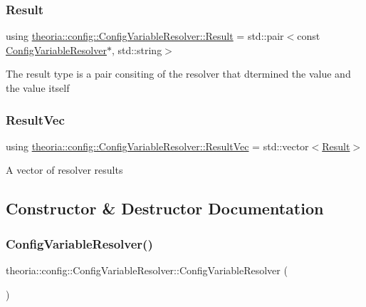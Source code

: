 \subsubsection{\texorpdfstring{Result}{Result}}
{\footnotesize\ttfamily using \hyperlink{classtheoria_1_1config_1_1ConfigVariableResolver_af27a85262d802c9ad4ecb1179efaf447}{theoria\+::config\+::\+Config\+Variable\+Resolver\+::\+Result} =  std\+::pair$<$const \hyperlink{classtheoria_1_1config_1_1ConfigVariableResolver}{Config\+Variable\+Resolver}$\ast$, std\+::string$>$}

The result type is a pair consiting of the resolver that dtermined the value and the value itself \mbox{\label{classtheoria_1_1config_1_1ConfigVariableResolver_a2d92a11d55181183ce4071566437f01b}} 
\subsubsection{\texorpdfstring{Result\+Vec}{ResultVec}}
{\footnotesize\ttfamily using \hyperlink{classtheoria_1_1config_1_1ConfigVariableResolver_a2d92a11d55181183ce4071566437f01b}{theoria\+::config\+::\+Config\+Variable\+Resolver\+::\+Result\+Vec} =  std\+::vector$<$\hyperlink{classtheoria_1_1config_1_1ConfigVariableResolver_af27a85262d802c9ad4ecb1179efaf447}{Result}$>$}

A vector of resolver results 

\subsection{Constructor \& Destructor Documentation}
\mbox{\label{classtheoria_1_1config_1_1ConfigVariableResolver_a90e26596be3efc1597909fd615a6a286}} 
\subsubsection{\texorpdfstring{Config\+Variable\+Resolver()}{ConfigVariableResolver()}}
{\footnotesize\ttfamily theoria\+::config\+::\+Config\+Variable\+Resolver\+::\+Config\+Variable\+Resolver (\begin{DoxyParamCaption}{ }\end{DoxyParamCaption})\hspace{0.3cm}{\ttfamily [inline]}}

